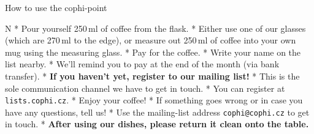 
\nonstopmode
\nopagenumbers
\typosize[14/18]
\chyph

\centerline{
\hsize
{}
}
\vskip-1.0cm
\tit How to use the cophi-point

\begitems\style N
	* Pour yourself 250\,ml of coffee from the flask.
	\begitems
		* Either use one of our glasses (which are 270\,ml to the edge),
		  or measure out 250\,ml of coffee into your own mug using the
		  measuring glass.
	\enditems
	* Pay for the coffee.
	\begitems
		* Write your name on the list nearby.
		* We'll remind you to pay at the end of the month (via bank transfer).
	\enditems
	* {\bf If you haven't yet, register to our mailing list!}
	\begitems
		* This is the sole communication channel we have to get in touch.
		* You can register at {\tt lists.cophi.cz}.
	\enditems
	* Enjoy your coffee!
	\begitems
		* If something goes wrong or in case you have any questions,
		  tell us!
		* Use the mailing-list address {\tt cophi@cophi.cz} to get in touch.
	\enditems
	* {\bf After using our dishes, please return it clean onto the table.}
\enditems
\vfill

\eject
\bye
